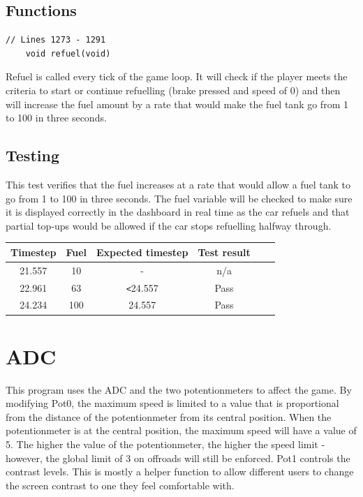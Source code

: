 \documentclass{article}
\begin{document}
\subsection*{Functions}
\begin{lstlisting}[style=CStyle]
	// Lines 1273 - 1291 
	void refuel(void)
\end{lstlisting}
Refuel is called every tick of the game loop. It will check if the player meets the criteria to start or continue refuelling (brake pressed and speed of 0) and then will increase the fuel amount by a rate that would make the fuel tank go from 1 to 100 in three seconds.
\newline

\subsection*{Testing}
This test verifies that the fuel increases at a rate that would allow a fuel tank to go from 1 to 100 in three seconds. The fuel variable will be checked to make sure it is displayed correctly in the dashboard in real time as the car refuels and that partial top-ups would be allowed if the car stops refuelling halfway through. 
\begin{center}
\begin{tabular}{ c c c c c c }
Timestep	& Fuel		& Expected timestep	& Test result	\\ \hline
21.557	& 10		& - 				& n/a 		\\
22.961	& 63		& \verb|<|24.557 		& Pass	\\
24.234	& 100		& 24.557 			& Pass 	\\ \hline
\end{tabular}
\end{center}

\clearpage

\section{ADC}
This program uses the ADC and the two potentionmeters to affect the game. By modifying Pot0, the maximum speed is limited to a value that is proportional from the distance of the potentionmeter from its central position. When the potentionmeter is at the central position, the maximum speed will have a value of 5. The higher the value of the potentionmeter, the higher the speed limit - however, the global limit of 3 on offroads will still be enforced.
\newline
Pot1 controls the contrast levels. This is mostly a helper function to allow different users to change the screen contrast to one they feel comfortable with.
\end{document}
